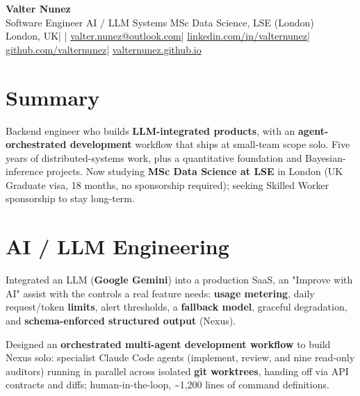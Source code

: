 \documentclass[10pt,a4paper]{article}
\begin{document}
{\Huge\bfseries Valter Nunez}\\[3pt]
{\color{soft}\large Software Engineer \textemdash{} AI / LLM Systems \;\textbar\; MSc Data Science, LSE (London)}\\[5pt]
{\footnotesize
London, UK\hspace{0.5em}\textcolor{soft}{|}\hspace{0.5em}%
\ifdefined\cvphone\href{tel:\cvphonetel}{\cvphone}\hspace{0.5em}\textcolor{soft}{|}\hspace{0.5em}\fi%
\href{mailto:valter.nunez@outlook.com}{valter.nunez@outlook.com}\hspace{0.5em}\textcolor{soft}{|}\hspace{0.5em}%
\href{https://www.linkedin.com/in/valternunez}{linkedin.com/in/valternunez}\hspace{0.5em}\textcolor{soft}{|}\hspace{0.5em}%
\href{https://github.com/valternunez}{github.com/valternunez}\hspace{0.5em}\textcolor{soft}{|}\hspace{0.5em}%
\href{https://valternunez.github.io}{valternunez.github.io}
}

\section*{Summary}
Backend engineer who builds \textbf{LLM-integrated products}, with an
\textbf{agent-orchestrated development} workflow that ships at small-team scope solo. Five years of
distributed-systems work, plus a quantitative foundation and Bayesian-inference projects. Now studying
\textbf{MSc Data Science at LSE} in London (UK Graduate visa, 18 months, no sponsorship required);
seeking Skilled Worker sponsorship to stay long-term.

\section*{AI / LLM Engineering}
\begin{tight}
  \item Integrated an LLM (\textbf{Google Gemini}) into a production SaaS, an "Improve with AI" assist with the controls a real feature needs: \textbf{usage metering}, daily request/token \textbf{limits}, alert thresholds, a \textbf{fallback model}, graceful degradation, and \textbf{schema-enforced structured output} (Nexus).
  \item Designed an \textbf{orchestrated multi-agent development workflow} to build Nexus solo: specialist Claude Code agents (implement, review, and nine read-only auditors) running in parallel across isolated \textbf{git worktrees}, handing off via API contracts and diffs; human-in-the-loop, \textasciitilde1{,}200 lines of command definitions.
\end{tight}
\end{document}
